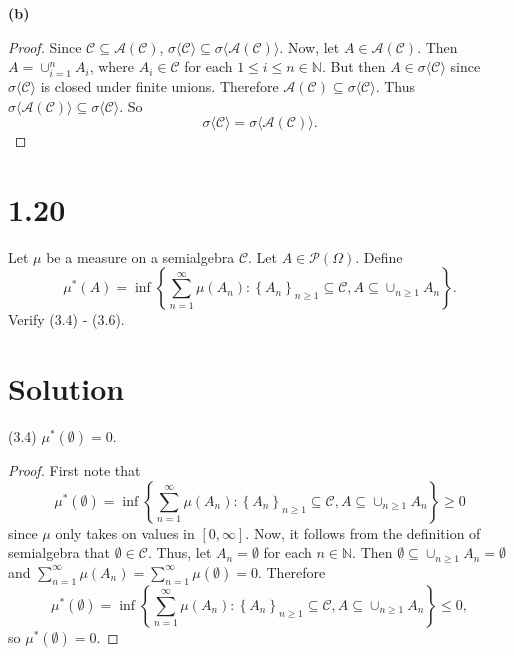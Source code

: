 \documentclass[12pt]{article}
\begin{document}
{\bf (b)}

\begin{proof}
Since $\mathcal{C} \subseteq \mathcal{A}(\mathcal{C})$, $\sigma\langle\mathcal{C}\rangle \subseteq \sigma\langle\mathcal{A}(\mathcal{C})\rangle$. Now,
let $A \in \mathcal{A}(\mathcal{C})$. Then $A = \cup_{i=1}^{n}A_{i}$, where $A_{i} \in \mathcal{C}$ for each $1\leq i \leq n \in \mathbb{N}$. But then
$A \in \sigma\langle\mathcal{C}\rangle$ since $\sigma\langle\mathcal{C}\rangle$ is closed under finite unions. Therefore $\mathcal{A}(\mathcal{C})
\subseteq \sigma\langle\mathcal{C}\rangle$. Thus $\sigma\langle\mathcal{A}(\mathcal{C})\rangle \subseteq \sigma\langle\mathcal{C}\rangle$. So 
\[ \sigma\langle\mathcal{C}\rangle = \sigma\langle\mathcal{A}(\mathcal{C})\rangle. \]
\end{proof}






\newpage
\section*{1.20}

Let $\mu$ be a measure on a semialgebra $\mathcal{C}$. Let $A \in \mathcal{P}(\Omega)$. Define
\[ \mu^{*}(A) = \inf\left\{ \sum_{n=1}^{\infty}\mu(A_{n}) : \left\{ A_{n} \right\}_{n\geq 1} \subseteq \mathcal{C}, A \subseteq \cup_{n\geq 1}A_{n}
\right\}. \]
Verify (3.4) - (3.6).

\section*{Solution}

(3.4) $\mu^{*}(\emptyset) = 0$.

\begin{proof}
First note that 
\[ \mu^{*}(\emptyset) = \inf\left\{ \sum_{n=1}^{\infty}\mu(A_{n}) : \left\{ A_{n} \right\}_{n\geq 1}\subseteq \mathcal{C}, A\subseteq\cup_{n\geq
1}A_{n} \right\} \geq 0 \]
since $\mu$ only takes on values in $[0,\infty]$.
Now, it follows from the definition of semialgebra that $\emptyset \in \mathcal{C}$. Thus, let $A_{n} = \emptyset$ for each $n \in \mathbb{N}$. Then
$\emptyset \subseteq \cup_{n\geq 1}A_{n} = \emptyset$ and $\sum_{n=1}^{\infty}\mu(A_{n}) = \sum_{n=1}^{\infty}\mu(\emptyset) = 0$.
Therefore 
\[ \mu^{*}(\emptyset) = \inf\left\{ \sum_{n=1}^{\infty}\mu(A_{n}) : \left\{ A_{n} \right\}_{n\geq 1}\subseteq \mathcal{C}, A\subseteq\cup_{n\geq 1}A_{n} \right\} \leq 0,
\]
so $\mu^{*}(\emptyset) = 0$.
\end{proof}
\end{document}

